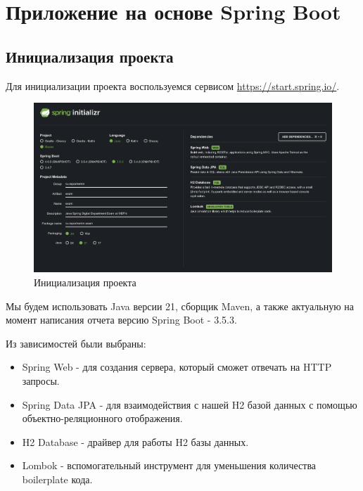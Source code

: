 \documentclass[a4paper, 14pt]{article}
\begin{document}
\newpage
\section{Приложение на основе Spring Boot}

\subsection{Инициализация проекта}

Для инициализации проекта воспользуемся сервисом \url{https://start.spring.io/}.

\begin{figure}[H]
	\centering
	\includegraphics[width=17cm]{resources/1.png}
	\caption{Инициализация проекта}
\end{figure}

Мы будем использовать Java версии 21, сборщик Maven, а также актуальную на момент написания отчета версию Spring Boot - 3.5.3.


Из зависимостей были выбраны:

\begin{itemize}
	\item Spring Web - для создания сервера, который сможет отвечать на HTTP запросы.
	\item Spring Data JPA - для взаимодействия с нашей H2 базой данных с помощью объектно-реляционного отображения.
	\item H2 Database - драйвер для работы H2 базы данных.
	\item Lombok - вспомогательный инструмент для уменьшения количества boilerplate кода.
\end{itemize}


\end{document}
